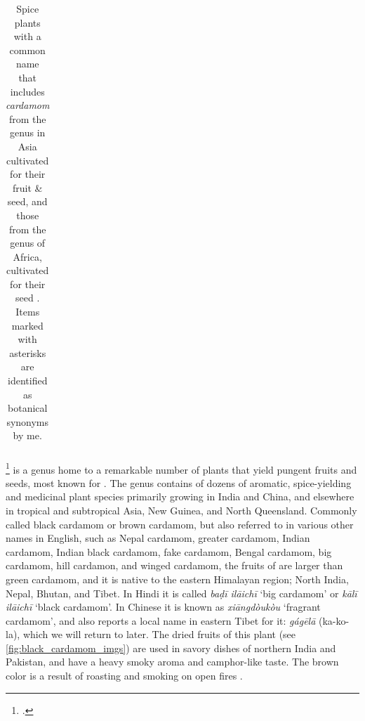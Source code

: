 \begin{table}[!ht]
\begin{tabularx}{\linewidth}{@{}lXl@{}}
\bottomrule
\end{tabularx}
\caption[Cardamoms in the genera , and .]{Spice plants with a common name that includes \textit{cardamom} from the  genus in Asia cultivated for their fruit \& seed, and those from the  genus of Africa, cultivated for their seed \autocite{van_wyk_culinary_2014}. Items marked with asterisks are identified as botanical synonyms by me.}
\label{table:amomum_aframomum}
\end{table}

\footcite[Amomum Roxb. ]{gbif} is a genus home to a remarkable number of plants that yield pungent fruits and seeds, most known for . The  genus contains of dozens of aromatic, spice-yielding and medicinal plant species primarily growing in India and China, and elsewhere in tropical and subtropical Asia, New Guinea, and North Queensland. Commonly called black cardamom or brown cardamom, but also referred to in various other names in English, such as Nepal cardamom, greater cardamom, Indian cardamom, Indian black cardamom, fake cardamom, Bengal cardamom, big cardamom, hill cardamon, and winged cardamom, the fruits of  are larger than green cardamom, and it is native to the eastern Himalayan region; North India, Nepal, Bhutan, and Tibet. In Hindi it is called 
\textit{baḍī ilāichī} `big cardamom' or 
\textit{k\={a}lī ilāichī} `black cardamom'. In Chinese it is known as  \textit{xiāngdòukòu} `fragrant cardamom', and \textcite[327]{hu_food_2005} also reports a local name in eastern Tibet for it:  \textit{gágēlā} (ka-ko-la), which we will return to later. The dried fruits of this plant (see \cref{fig:black_cardamom_imgs}) are used in savory dishes of northern India and Pakistan, and have a heavy smoky aroma and camphor-like taste. The brown color is a result of roasting and smoking on open fires \autocite[132]{van_wyk_culinary_2014}.

